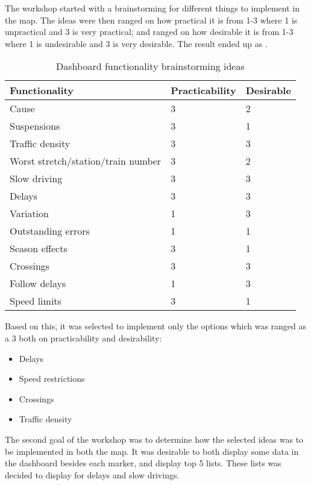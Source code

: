 The workshop started with a brainstorming for different things to implement in
the map. The ideas were then ranged on how practical it is from 1-3 where 1 is
unpractical and 3 is very practical; and ranged on how desirable it is from 1-3
where 1 is undesirable and 3 is very desirable. The result ended up as .

\begin{table}[!h]\small
	\begin{tabularx}{\textwidth}{|X|l|l|}
		\hline
		Functionality & Practicability & Desirable \\
		\hline
		Cause & 3 & 2\\
		\hline
		Suspensions & 3 & 1\\
		\hline
		Traffic density & 3 & 3\\
		\hline
	 	Worst stretch/station/train number & 3 & 2\\
		\hline
		Slow driving & 3 & 3\\
		\hline
		Delays & 3 & 3\\
		\hline
		Variation & 1 & 3\\
		\hline
		Outstanding errors & 1 & 1\\
		\hline
		Season effects & 3 & 1\\
		\hline
		Crossings & 3 & 3\\
		\hline
		Follow delays & 1 & 3\\
		\hline
		Speed limits & 3 & 1\\
		\hline
	\end{tabularx}
\caption{Dashboard functionality brainstorming ideas}
\label{table:dashboard_functionality_wants_vs_needs}
\end{table}

Based on this, it was selected to implement only the options which was ranged
as a 3 both on practicability and desirability:

\begin{itemize}
  \item Delays
  \item Speed restrictions
  \item Crossings
  \item Traffic density
\end{itemize}

The second goal of the workshop was to determine how the selected ideas was to
be implemented in both the map. It was desirable to both display some data in
the dashboard besides each marker, and display top 5 lists. These lists was
decided to display for delays and slow drivings. 

